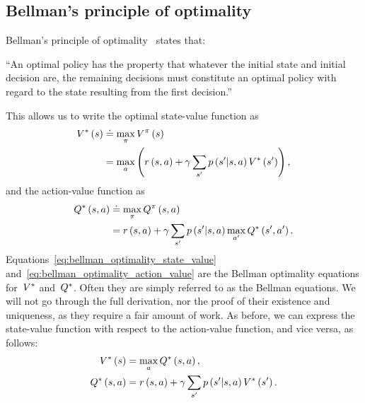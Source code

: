 \subsection{Bellman's principle of optimality}
Bellman's principle of optimality~{\cite[Chap. III.3]{bellman1957dynamic}} states that:
\begin{displayquote}
``An optimal policy has the property that whatever the initial state and initial decision are, the remaining decisions must constitute an optimal policy with regard to the state resulting from the first decision.''
\end{displayquote}
This allows us to write the optimal state-value function as
\begin{align} \label{eq:bellman_optimality_state_value}
	\statevalue\optimal\left(\state\right)
		&\doteq\max_{\policy}\statevalue\policyscript\left(\state\right) \notag \\
		&=\max_{\action}\left(\immediatereward\left(\state,\action\right)+\discount\sum_{\state'}\transition\left(\state'\middle\vert\state,\action\right)\statevalue\optimal\left(\state'\right)\right),
\end{align}
and the action-value function as
\begin{align} \label{eq:bellman_optimality_action_value}
	\actionvalue\optimal\left(\state,\action\right)
		&\doteq\max_{\policy}\actionvalue\policyscript\left(\state,\action\right) \notag \\
		&=\immediatereward\left(\state,\action\right)+\discount\sum_{\state'}\transition\left(\state'\middle\vert\state,\action\right)\max_{\action'}\actionvalue\optimal\left(\state',\action'\right).
\end{align}
Equations~\eqref{eq:bellman_optimality_state_value} and~\eqref{eq:bellman_optimality_action_value} are the Bellman optimality equations for~${V^{*}}$ and~${Q^{*}}$. Often they are simply referred to as the Bellman equations. We will not go through the full derivation, nor the proof of their existence and uniqueness, as they require a fair amount of work. As before, we can express the state-value function with respect to the action-value function, and vice versa, as follows:
\begin{equation}
\begin{split}
	\statevalue\optimal\left(\state\right)&=\max_{\action}\actionvalue\optimal\left(\state,\action\right), \\
	\actionvalue\optimal\left(\state,\action\right)&=\immediatereward\left(\state,\action\right)+\discount\sum_{\state'}\transition\left(\state'\middle\vert\state,\action\right)\statevalue\optimal\left(\state'\right).
\end{split}
\end{equation}

